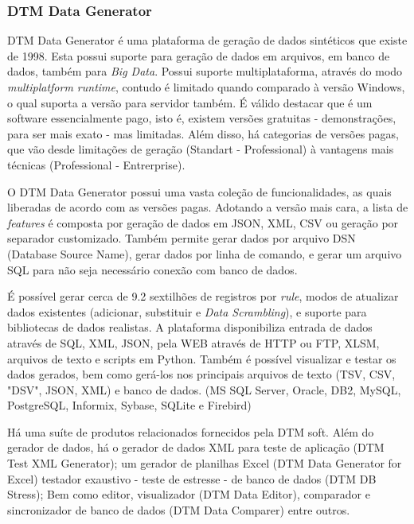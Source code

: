 \documentclass[
	12pt,				%
	openright,			%
	twoside,			%
	a4paper,			%
	english,			%
	brazil				%
	]{abntex2}
\begin{document}
	\subsubsection{DTM Data Generator}
	DTM Data Generator \cite{DTMDataGenerator} é uma plataforma de geração de dados sintéticos que existe de 1998.
	Esta possui suporte para geração de dados em arquivos, em banco de dados, também para \emph{Big Data}.
	Possui suporte multiplataforma, através do modo \emph{multiplatform runtime}, contudo é limitado quando comparado à versão Windows, o qual suporta a versão para servidor também.
	É válido destacar que é um software essencialmente pago, isto é, existem versões gratuitas - demonstrações, para ser mais exato - mas limitadas.
	Além disso, há categorias de versões pagas, que vão desde limitações de geração (Standart - Professional) à vantagens mais técnicas (Professional - Entrerprise).
	\par
	O DTM Data Generator possui uma vasta coleção de funcionalidades, as quais liberadas de acordo com as versões pagas.
	Adotando a versão mais cara, a lista de \emph{features} é composta por geração de dados em JSON, XML, CSV ou geração por separador customizado.
	Também permite gerar dados por arquivo DSN (Database Source Name), gerar dados por linha de comando, e gerar um arquivo SQL para não seja necessário conexão com banco de dados.
	\par
	É possível gerar cerca de 9.2 sextilhões de registros por \emph{rule}, modos de atualizar dados existentes (adicionar, substituir e \emph{Data Scrambling}), e suporte para bibliotecas de dados realistas.
	A plataforma disponibiliza entrada de dados através de SQL, XML, JSON, pela WEB através de HTTP ou FTP, XLSM, arquivos de texto e scripts em Python.
	Também é possível visualizar e testar os dados gerados, bem como gerá-los nos principais arquivos de texto (TSV, CSV, "DSV", JSON, XML) e banco de dados. (MS SQL Server, Oracle, DB2, MySQL, PostgreSQL, Informix, Sybase, SQLite e Firebird) 
	\par
	Há uma suíte de produtos relacionados fornecidos pela DTM soft. 
	Além do gerador de dados, 
		há o gerador de dados XML para teste de aplicação (DTM Test XML Generator);
		um gerador de planilhas Excel (DTM Data Generator for Excel)
		testador exaustivo - teste de estresse - de banco de dados (DTM DB Stress);
		Bem como editor, visualizador (DTM Data Editor), comparador e sincronizador de banco de dados (DTM Data Comparer) entre outros. 
\end{document}
